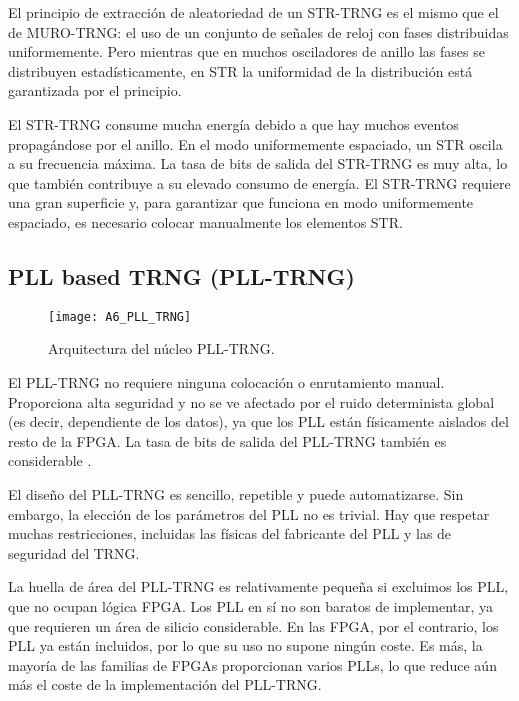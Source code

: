                 El principio de extracción de aleatoriedad de un STR-TRNG es el mismo que el de MURO-TRNG: el uso de un conjunto de señales de reloj con fases distribuidas uniformemente. Pero mientras que en muchos osciladores de anillo las fases se distribuyen estadísticamente, en STR la uniformidad de la distribución está garantizada por el principio. 

                El STR-TRNG consume mucha energía debido a que hay muchos eventos propagándose por el anillo. En el modo uniformemente espaciado, un STR oscila a su frecuencia máxima. La tasa de bits de salida del STR-TRNG es muy alta, lo que también contribuye a su elevado consumo de energía. El STR-TRNG requiere una gran superficie y, para garantizar que funciona en modo uniformemente espaciado, es necesario colocar manualmente los elementos STR.
				
				
		\subsection{PLL based TRNG (PLL-TRNG)}
				
				\begin{figure}[hbtp]
					\centering
					\texttt{[image: A6\_PLL\_TRNG]}
					\caption{Arquitectura del núcleo PLL-TRNG.}
					\label{fig:A6_PLL_TRNG}
				\end{figure}

                El PLL-TRNG no requiere ninguna colocación o enrutamiento manual. Proporciona alta seguridad y no se ve afectado por el ruido determinista global (es decir, dependiente de los datos), ya que los PLL están físicamente aislados del resto de la FPGA. La tasa de bits de salida del PLL-TRNG también es considerable \cite{Fischer2019}.

                El diseño del PLL-TRNG es sencillo, repetible y puede automatizarse. Sin embargo, la elección de los parámetros del PLL no es trivial. Hay que respetar muchas restricciones, incluidas las físicas del fabricante del PLL  y las de seguridad del TRNG. 

                La huella de área del PLL-TRNG es relativamente pequeña si excluimos los PLL, que no ocupan lógica FPGA. Los PLL en sí no son baratos de implementar, ya que requieren un área de silicio considerable. En las FPGA, por el contrario, los PLL ya están incluidos, por lo que su uso no supone ningún coste. Es más, la mayoría de las familias de FPGAs proporcionan varios PLLs, lo que reduce aún más el coste de la implementación del PLL-TRNG.

